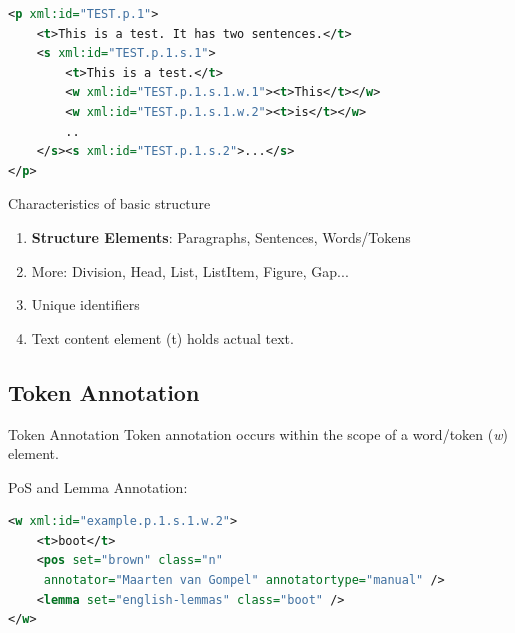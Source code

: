 \documentclass[compress,10pt]{beamer}
\begin{document}
\begin{frame}[fragile]
	\begin{example}
\begin{lstlisting}[language=xml]
<p xml:id="TEST.p.1">
	<t>This is a test. It has two sentences.</t>
	<s xml:id="TEST.p.1.s.1">        
	    <t>This is a test.</t>
	    <w xml:id="TEST.p.1.s.1.w.1"><t>This</t></w>
	    <w xml:id="TEST.p.1.s.1.w.2"><t>is</t></w>
	    ..
	</s><s xml:id="TEST.p.1.s.2">...</s>                
</p>                
\end{lstlisting}    
	\end{example}

    \begin{block}{Characteristics of basic structure}
      \begin{enumerate}
        \item \textbf{Structure Elements}: Paragraphs, Sentences, Words/Tokens  
        \item More: Division, Head, List, ListItem, Figure, Gap...
        \item Unique identifiers
        \item Text content element (t) holds actual text.
      \end{enumerate}
    \end{block}
\end{frame}


\subsection{Token Annotation}

\begin{frame}[fragile]
    \begin{block}{Token Annotation}
        Token annotation occurs within the scope of a word/token (\emph{w}) element.
    \end{block}
    \begin{example}
       PoS and Lemma Annotation:
\begin{lstlisting}[language=xml]
<w xml:id="example.p.1.s.1.w.2">
    <t>boot</t>
    <pos set="brown" class="n" 
     annotator="Maarten van Gompel" annotatortype="manual" />
    <lemma set="english-lemmas" class="boot" />
</w>                         
\end{lstlisting}        
    \end{example}
\end{frame}
\end{document}
